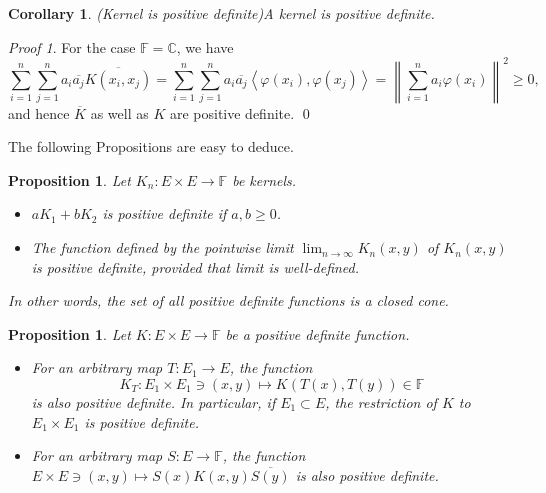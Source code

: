 \documentclass[a4paper,12pt]{article}
\newtheorem{prp}[thm]{Proposition}
\newtheorem{cor}[thm]{Corollary}
\theoremstyle{remark}
\newtheorem*{prf}{Proof}
\theoremstyle{definition}
\newtheorem{rem}[thm]{Remark}
\theoremstyle{definition}
\theoremstyle{definition}
\newcommand{\ip}[2]{\left<#1, #2 \right>}
\newcommand{\norm}[1]{\left\| #1 \right\|}
\newcommand{\ev}[1]{\mathrm{ev}_{#1}}
\newcommand{\adj}[1]{#1^{\star}}
\newcommand{\fin}{\hfill \( \triangleleft \) }
\begin{document}
\begin{cor} (Kernel is positive definite)\label{kernel is pd}
	A kernel is positive definite.
\end{cor}
\begin{prf}
	For the case \( \mathbb{F}=\mathbb{C} \), we have
	\begin{equation*}
		\sum_{i=1}^{n} \sum_{j=1}^{n} a_i \overline{a_j} \overline{K(x_i,x_j)}
		= \sum_{i=1}^{n} \sum_{j=1}^{n} a_i \overline{a_j} \ip{\varphi(x_i)}{\varphi(x_j)}
		= \norm{\sum_{i=1}^{n} a_i \varphi(x_i) }^2 \ge 0,
	\end{equation*}
	and hence \( \overline{K} \) as well as \( K \) are positive definite.
	\qed\end{prf}


The following Propositions are easy to deduce.
\begin{prp}
	Let \( K_n : E \times E \to \mathbb{F} \) be kernels.
	\begin{itemize}
		\item[(a)] \( a K_1 + b K_2 \) is positive definite if \( a, b \ge 0 \).
		\item[(b)] The function defined by the pointwise limit \( \lim_{n \to \infty} K_n(x,y) \) of \( K_n(x,y) \) is positive definite, provided that limit is well-defined.
	\end{itemize}
	In other words, the set of all positive definite functions is a closed cone.
\end{prp}

\begin{prp} \label{pd with map is pd}
	Let \( K:E \times E \to \mathbb{F} \) be a positive definite function.
	\begin{itemize}
		\item[(a)] For an arbitrary map \( T:E_1 \to E \), the function
		      \begin{equation*}
			      K_T:E_1 \times E_1 \ni (x,y)  \mapsto K(T(x),T(y)) \in \mathbb{F}
		      \end{equation*}
		      is also positive definite. In particular, if \( E_1 \subset E \), the restriction of \( K \) to \( E_1 \times E_1 \) is positive definite.
		\item[(b)] For an arbitrary map \( S:E \to \mathbb{F} \), the function \(E \times E \ni (x,y) \mapsto  S(x)K(x,y)\overline{S(y)} \) is also positive definite.
	\end{itemize}
\end{prp}
\end{document}
